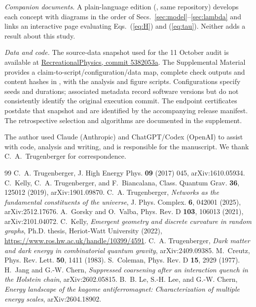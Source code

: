 \documentclass[aps,pre,10pt,twocolumn,superscriptaddress,nofootinbib]{revtex4-2}
\begin{document}
\emph{Companion documents.} A plain-language edition (, same
repository) develops each concept with diagrams in the order of
Secs.~\ref{sec:model}--\ref{sec:lambda} and links an interactive page evaluating
Eqs.~(\ref{eq:H}) and (\ref{eq:tau}). Neither adds a result about this study.

\emph{Data and code.} The source-data snapshot used for the 11 October audit is available at
\href{https://github.com/EmilySmithCreate/RecreationalPhysics/tree/5382053a60c4137cd446f83355e2a12177bb94ea}{RecreationalPhysics, commit 5382053a}.
The Supplemental Material provides a claim-to-script/configuration/data map, complete check outputs
and content hashes in , with the analysis and figure scripts.
Configurations specify seeds and durations; associated metadata
record software versions but do not consistently identify the original execution commit.
The endpoint certificates postdate that snapshot and
are identified by the accompanying release manifest. The retrospective selection and algorithms
are documented in the supplement.

\begin{acknowledgments}
The author used Claude (Anthropic) and ChatGPT/Codex (OpenAI) to assist with code, analysis and writing,
and is responsible for the manuscript. We thank C.~A.~Trugenberger for correspondence.
\end{acknowledgments}

\begin{thebibliography}{99}
 C.~A. Trugenberger, J. High Energy Phys. \textbf{09} (2017) 045, arXiv:1610.05934.
 C.~Kelly, C.~A. Trugenberger, and F.~Biancalana, Class. Quantum Grav. \textbf{36}, 125012 (2019), arXiv:1901.09870.
 C.~A. Trugenberger, \emph{Networks as the fundamental constituents of the universe}, J. Phys. Complex. \textbf{6}, 042001 (2025), arXiv:2512.17676.
 A.~Gorsky and O.~Valba, Phys. Rev. D \textbf{103}, 106013 (2021), arXiv:2101.04072.
 C.~Kelly, \emph{Emergent geometry and discrete curvature in random graphs}, Ph.D. thesis,
Heriot-Watt University (2022), \url{https://www.ros.hw.ac.uk/handle/10399/4591}.
 C.~A. Trugenberger, \emph{Dark matter and dark energy in combinatorial quantum gravity}, arXiv:2409.09385.
 M.~Creutz, Phys. Rev. Lett. \textbf{50}, 1411 (1983).
 S.~Coleman, Phys. Rev. D \textbf{15}, 2929 (1977).
 H.~Jang and G.-W. Chern, \emph{Suppressed coarsening after an interaction quench in the Holstein chain}, arXiv:2602.05815.
 B.~B. Le, S.-H. Lee, and G.-W. Chern, \emph{Energy landscape of the kagome antiferromagnet: Characterization of multiple energy scales}, arXiv:2604.18902.
\end{thebibliography}
\end{document}
